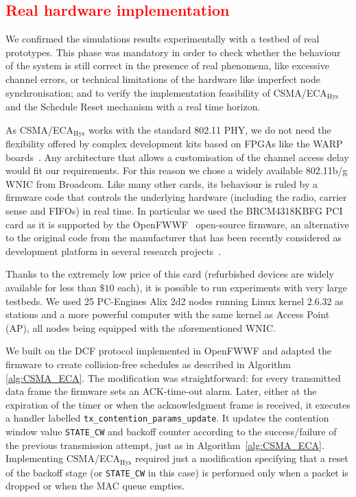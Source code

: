 \textcolor{red}{\section{Real hardware implementation}\label{EDCA}}

We confirmed the simulations results experimentally with a testbed of real prototypes. This phase was mandatory in order to check whether the behaviour of the system is still correct in the presence of real phenomena, like excessive channel errors, or technical limitations of the hardware like imperfect node synchronisation; and to verify the implementation feasibility of CSMA/ECA$_{\text{Hys}}$ and the Schedule Reset mechanism with a real time horizon.

As CSMA/ECA$_{\text{Hys}}$ works with the standard 802.11 PHY, we do not need the flexibility offered by complex development kits based on FPGAs like the WARP boards~\cite{amiri2007warp}. Any architecture that allows a customisation of the channel access delay would fit our requirements. For this reason we chose a widely available 802.11b/g WNIC from Broadcom. Like many other cards, its behaviour is ruled by a firmware code that controls the underlying hardware (including the radio, carrier sense and FIFOs) in real time. In particular we used the BRCM4318KBFG PCI card as it is supported by the OpenFWWF~\cite{OpenFWWF} open-source firmware, an alternative to the original code from the manufacturer that has been recently considered as development platform in several research projects~\cite{WMP,gringolitmc14,gringoliccr14,berger14,CF-MAC}. 

Thanks to the extremely low price of this card (refurbished devices are widely available for less than $\$10$ each), it is possible to run experiments with very large testbeds. We used 25 PC-Engines Alix 2d2 nodes running Linux kernel 2.6.32 as stations and a more powerful computer with the same kernel as Access Point (AP), all nodes being equipped with the aforementioned WNIC.

We built on the DCF protocol implemented in OpenFWWF and adapted the firmware to create collision-free schedules as described in Algorithm \ref{alg:CSMA_ECA}. The modification was straightforward: for every transmitted data frame the firmware sets an ACK-time-out alarm. Later, either at the expiration of the timer or when the acknowledgment frame is received, it executes a handler labelled {\tt tx\_contention\_params\_update}. It updates the contention window value {\tt STATE\_CW} and backoff counter according to the success/failure of the previous transmission attempt, just as in Algorithm~\ref{alg:CSMA_ECA}. Implementing CSMA/ECA$_{\text{Hys}}$ required just a modification specifying that a reset of the backoff stage (or {\tt STATE\_CW} in this case) is performed only when a packet is dropped or when the MAC queue empties.

